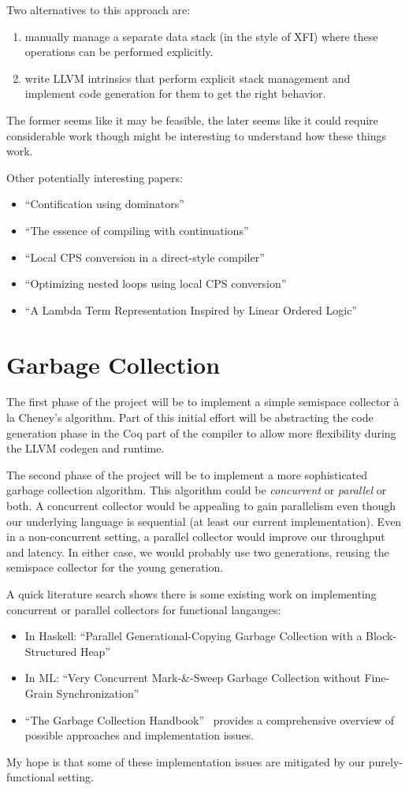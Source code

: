 \documentclass{article}
\begin{document}
Two alternatives to this approach are:
\begin{enumerate}
\item manually manage a separate data stack (in the style of XFI) where these operations can be performed explicitly.
\item write LLVM intrinsics that perform explicit stack management and implement code generation for them to get the right behavior.
\end{enumerate}
The former seems like it may be feasible, the later seems like it could require considerable work though might be interesting to understand how these things work.

Other potentially interesting papers:
\begin{itemize}
\item ``Contification using dominators''~\cite{fluet01contification}
\item ``The essence of compiling with continuations''~\cite{flanagan04essence}
\item ``Local CPS conversion in a direct-style compiler''~\cite{reppy01local}
\item ``Optimizing nested loops using local CPS conversion''~\cite{reppy02optimizing}
\item ``A Lambda Term Representation Inspired by Linear Ordered Logic''~\cite{abel11lambda}
\end{itemize}

\section{Garbage Collection}
\label{sec:gc}
The first phase of the project will be to implement a simple semispace collector \`a la Cheney's algorithm. Part of this initial effort will be abstracting the code generation phase in the Coq part of the compiler to allow more flexibility during the LLVM codegen and runtime.

The second phase of the project will be to implement a more sophisticated garbage collection algorithm. This algorithm could be \emph{concurrent} or \emph{parallel} or both. A concurrent collector would be appealing to gain parallelism even though our underlying language is sequential (at least our current implementation). Even in a non-concurrent setting, a parallel collector would improve our throughput and latency. In either case, we would probably use two generations, reusing the semispace collector for the young generation.

A quick literature search shows there is some existing work on implementing concurrent or parallel collectors for functional langauges:
\begin{itemize}
\item In Haskell: ``Parallel Generational-Copying Garbage Collection with a Block-Structured Heap''~\cite{marlow:parallel}
\item In ML: ``Very Concurrent Mark-\&-Sweep Garbage Collection without Fine-Grain Synchronization''~\cite{Huelsbergen}
\item ``The Garbage Collection Handbook''~\cite{gcbook} provides a comprehensive overview of possible approaches and implementation issues.
\end{itemize}

My hope is that some of these implementation issues are mitigated by our purely-functional setting.




\end{document}
